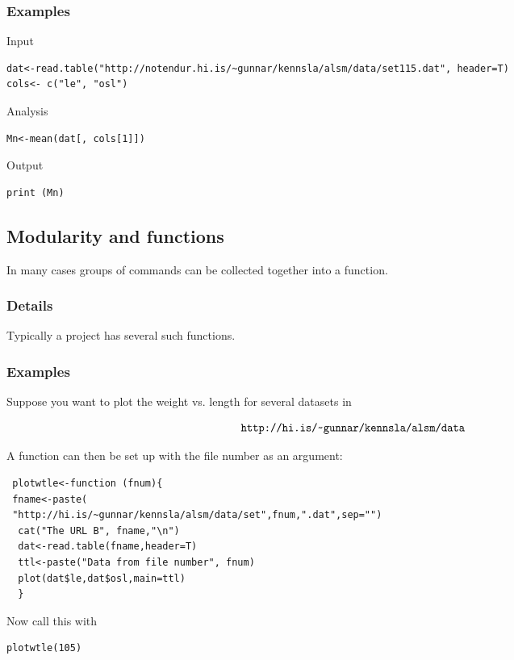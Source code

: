 \documentclass[12pt,a4paper]{article}
\theoremstyle{regla}
\theoremstyle{remark}
\theoremstyle{definition}
\theoremstyle{nonumberbreak}
\begin{document}
\subsubsection{Examples}
\begin{xmpl}
Input
\begin{lstlisting}
dat<-read.table("http://notendur.hi.is/~gunnar/kennsla/alsm/data/set115.dat", header=T)
cols<- c("le", "osl")
\end{lstlisting}

Analysis
\begin{lstlisting}
Mn<-mean(dat[, cols[1]])
\end{lstlisting}


Output
\begin{lstlisting}
print (Mn)
\end{lstlisting}
\end{xmpl}

\subsection{Modularity and functions}
\begin{fbox}
\begin{minipage}{0.97\textwidth}
In many cases groups of commands can be collected together into a function. 
\end{minipage}
\end{fbox}
\subsubsection{Details}
Typically a project has several such functions.
\subsubsection{Examples}
\begin{xmpl}

Suppose you want to plot the weight vs. length for several datasets in

$$\verb|http://hi.is/~gunnar/kennsla/alsm/data|$$

A function can then be set up with the file number as an argument:
\begin{lstlisting}
 plotwtle<-function (fnum){
 fname<-paste(
 "http://hi.is/~gunnar/kennsla/alsm/data/set",fnum,".dat",sep="")
  cat("The URL B", fname,"\n")
  dat<-read.table(fname,header=T)
  ttl<-paste("Data from file number", fnum)
  plot(dat$le,dat$osl,main=ttl)
  }
\end{lstlisting}

Now call this with
\begin{lstlisting}
plotwtle(105)
\end{lstlisting}
\end{xmpl}
\end{document}

